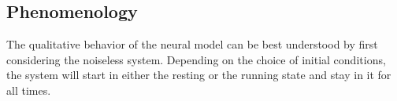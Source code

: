 \documentclass[12pt,a4paper]{article}
\begin{document}
\subsection{Phenomenology}
The qualitative behavior of the neural model can be best understood by first considering the noiseless system. Depending on the choice of initial conditions, the system will start in either the resting or the running state and stay in it for all times.
\newpage
\begin{figure}[H]

\end{figure}
\end{document}

